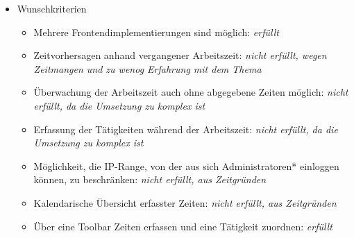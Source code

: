 \begin{itemize}
    
  \item Wunschkriterien
    \begin{itemize}
	    \item Mehrere Frontendimplementierungen sind möglich: \emph{erfüllt}
    	\item Zeitvorhersagen anhand vergangener Arbeitszeit: \emph{nicht erfüllt, wegen Zeitmangen und zu wenog Erfahrung mit dem Thema}
    	\item Überwachung der Arbeitszeit auch ohne abgegebene Zeiten möglich: \emph{nicht erfüllt, da die Umsetzung zu komplex ist} 
    	\item Erfassung der Tätigkeiten während der Arbeitszeit: \emph{nicht erfüllt, da die Umsetzung zu komplex ist}
    	\item Möglichkeit, die IP-Range, von der aus sich Administratoren* einloggen können, zu beschränken: \emph{nicht erfüllt, aus Zeitgründen}
    	\item Kalendarische Übersicht erfasster Zeiten: \emph{nicht erfüllt, aus Zeitgründen}
    	\item Über eine Toolbar Zeiten erfassen und eine Tätigkeit zuordnen: \emph{erfüllt}
  \end{itemize}
\end{itemize}



      
